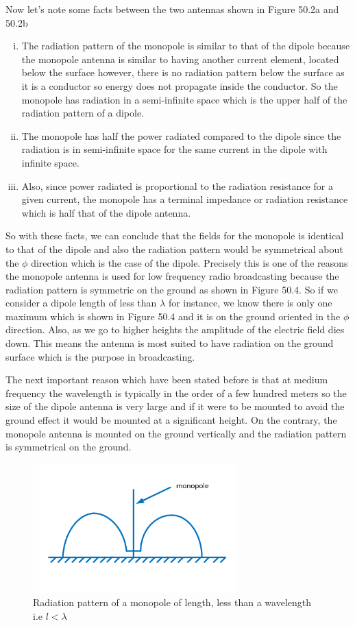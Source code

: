Now let's note some facts between the two antennas shown in Figure 50.2a and 50.2b
\begin{enumerate}[(i)]
\item The radiation pattern of the monopole is similar to that of the dipole because the monopole antenna is similar to having another current element, located below the surface however, there is no radiation pattern below the surface as it is a conductor so energy does not propagate inside the conductor. So the monopole has radiation in a semi-infinite space which is the upper half of the radiation pattern of a dipole.
\item The monopole has half the power radiated compared to the dipole since the radiation is in semi-infinite space for the same current in the dipole with infinite space.
\item Also, since power radiated is proportional to the radiation resistance for a given current, the monopole has a terminal impedance or radiation resistance which is half that of the dipole antenna.
\end{enumerate}
So with these facts, we can conclude that the fields for the monopole is identical to that of the dipole and also the radiation pattern would be symmetrical about the $\phi$ direction which is the case of the dipole. Precisely this is one of the reasons the monopole antenna is used for low frequency radio broadcasting because the radiation pattern is symmetric on the ground as shown in Figure 50.4. So if we consider a dipole length of less than $\lambda$ for instance, we know there is only one maximum which is shown in Figure 50.4 and it is on the ground oriented in the $\phi$ direction. Also, as we go to higher heights the amplitude of the electric field dies down. This means the antenna is most suited to have radiation on the ground surface which is the purpose in broadcasting.

The next important reason which have been stated before is that at medium frequency the wavelength is typically in the order of a few hundred meters so the size of the dipole antenna is very large and if it were to be mounted to avoid the ground effect it would be mounted at a significant height. On the contrary, the monopole antenna is mounted on the ground vertically and the radiation pattern is symmetrical on the ground.
\begin{figure}[h]
\centering
\includegraphics[height=5cm]{./graphics/image53_3}
\caption{Radiation pattern of a monopole of length, less than a wavelength i.e $l < \lambda$}
\label{fig:fig3}
\end{figure}

